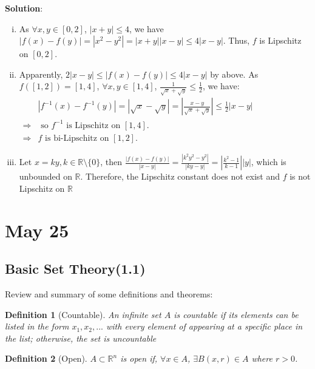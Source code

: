\documentclass[12pt, a4paper]{article}
\newtheorem{definition}{Definition}[subsection]
\begin{document}
\textbf{Solution}: 
\begin{enumerate}[(i)]
    \item As $\forall x, y\in [0,2]$, $|x+y|\leq 4$, we have $|f(x)-f(y)|=\left|x^{2}-y^{2}\right|=|x+y||x-y| \leq 4|x-y|$.
    Thus, $f$ is Lipschitz on $[0,2]$.
    \item Apparently, $2|x-y|\leq|f(x) - f(y)|\leq 4|x-y|$ by above. As $f([1, 2]) = [1, 4]$, $\forall x, y \in [1, 4]$, $\displaystyle \frac{1}{\sqrt{x}+\sqrt{y}} \leq \frac{1}{2}$, we have: \\
    \(
    \begin{aligned}
        &\displaystyle \left|f^{-1}(x)-f^{-1}(y)\right|=|\sqrt{x}-\sqrt{y}|=\left|\frac{x-y}{\sqrt{x}+\sqrt{y}}\right| \leq \frac{1}{2}|x-y|\\
        \Rightarrow & \text{ so } f^{-1} \text{ is Lipschitz on } [1,4]. \\
        \Rightarrow & f \text{ is bi-Lipschitz on }[1,2].
    \end{aligned}
    \)
    \item Let $x = ky, k\in\mathbb{R}\setminus\{0\}$, then $\displaystyle \frac{|f(x) - f(y)|}{|x - y|} = \frac{|k^2y^2 - y^2|}{|ky - y|} = \left|\frac{k^2 - 1}{k-1} \right | |y|$, which is unbounded on $\mathbb{R}$. Therefore, the Lipschitz constant does not exist and $f$ is not Lipschitz on $\mathbb{R}$

\end{enumerate}


\newpage
\section{May 25}
\subsection{Basic Set Theory(1.1)}

Review and summary of some definitions and theorems:

\begin{definition}[Countable]
    An infinite set $A$ is countable if its elements 
    can be listed in the form $x_1, x_2, ...$ with every 
    element of appearing at a specific place in the list; 
    otherwise, the set is uncountable
\end{definition}

\begin{definition}[Open]
    $A \subset \mathbb{R}^n$ is open if, $\forall x\in A$, $\exists B(x, r)\in A$ where $r>0$.
\end{definition}
\end{document}
